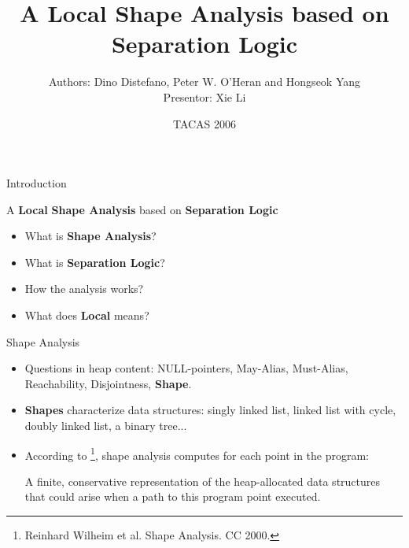 \documentclass[aspectratio=1610, 13pt]{beamer}
\title{A Local Shape Analysis based on Separation Logic}
\date{TACAS 2006}
\author{Authors: Dino Distefano, Peter W. O'Heran and Hongseok Yang\\Presentor: Xie Li}
\begin{document}
\maketitle
\begin{frame}{Introduction}
    \begin{center}
        A \textbf{Local} \textbf{Shape Analysis} based on \textbf{Separation Logic}
    \end{center}
    
\begin{itemize}
    \item What is \textbf{Shape Analysis}?
    \item What is \textbf{Separation Logic}?
    \item How the analysis works?
    \item What does \textbf{Local} means?

\end{itemize}
\end{frame}



\begin{frame}{Shape Analysis}
\begin{itemize}
    \item Questions in heap content: NULL-pointers, May-Alias, Must-Alias,  Reachability, Disjointness, \textbf{Shape}.
    
    \item \textbf{Shapes} characterize data structures: singly linked list, linked list with cycle, doubly linked list, a binary tree...
    
    \item According to \footnote{Reinhard Wilheim et al. Shape Analysis. CC 2000.}, shape analysis computes for each point in the program:
    
    A finite, conservative representation of the heap-allocated data structures that could arise when a path to this program point executed.
\end{itemize}
    
\end{frame}
\end{document}
